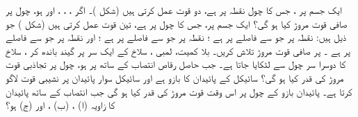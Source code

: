 ایک جسم پر ، جس  کا چول نقطہ  پر  ہے،   دو قوت عمل کرتی ہیں (شکل )۔ اگر ، ، ،   اور  ہو، چول پر صافی قوت مروڑ کیا ہو گی؟
ایک جسم پر، جس کا چول  پر ہے، تین قوت عمل کرتی ہیں (شکل )  جو ذیل ہیں:
نقطہ  پر جو    سے   فاصلے پر ہے ؛ 
نقطہ  پر جو    سے   فاصلے پر ہے ؛   اور 
نقطہ  پر جو    سے   فاصلے پر ہے ۔  پر صافی قوت مروڑ تلاش کریں۔
بلا کمیت،   لمبی ، سلاخ کے ایک سر  پر   گیند باندھ کر ، سلاخ کا دوسرا  سر چول   سے لٹکایا جاتا ہے۔ جب   حاصل  رقاص  انتصاب کے ساتھ  پر ہو، چول پر تجاذبی قوت مروڑ کی قدر کیا ہو گی؟
سائیکل  کے  پائیدان  کا بازو  ہے اور سائیکل سوار پائیدان پر   نشیبی  قوت لاگو کرتا ہے۔ پائیدان بازو  کے چول پر  اس وقت قوت مروڑ کی قدر کیا ہو گی جب  انتصاب کے ساتھ پائیدان کا زاویہ (ا) ، (ب)  ، اور (ج)   ہو؟

